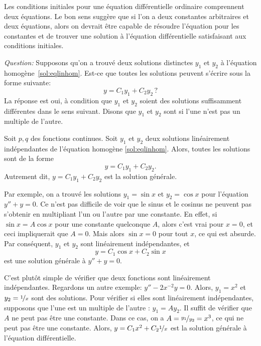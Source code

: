 \medskip

Les conditions initiales pour une équation différentielle ordinaire comprennent deux équations. Le bon sens suggère que si l'on a deux constantes arbitraires et deux équations, alors on devrait être capable de résoudre l'équation pour les constantes et de trouver une solution à l'équation différentielle satisfaisant aux conditions initiales. 

\emph{Question:} Supposons qu'on a trouvé deux solutions distinctes $y_1$ et $y_2$ à l'équation homogène~\eqref{sol:eqlinhom}.  Est-ce que toutes les solutions peuvent s'écrire sous la forme suivante:
\begin{equation*}
	y = C_1 y_1 + C_2 y_2\,?
\end{equation*}
La réponse est oui, à condition que $y_1$ et $y_2$ soient des solutions suffisamment différentes dans le sens suivant.  Disons que $y_1$ et $y_2$ sont \emph{} si l'une n'est pas un multiple de l'autre.

\begin{theorem}
	Soit $p, q$ des fonctions continues.
	Soit $y_1$ et $y_2$ deux solutions linéairement indépendantes de l'équation homogène \eqref{sol:eqlinhom}. 
	Alors, toutes les solutions sont de la forme 
	\begin{equation*}
		y = C_1 y_1 + C_2 y_2 .
	\end{equation*}
	Autrement dit, $y = C_1 y_1 + C_2 y_2$ est la solution générale.
\end{theorem}

Par exemple, on a trouvé les solutions 
$y_1 = \sin x$ et $y_2 = \cos x$ pour l'équation $y'' + y = 0$.  Ce n'est pas difficile de voir que le sinus et le cosinus ne peuvent pas s'obtenir en multipliant l'un ou l'autre par une constante.
En effet, si $\sin x = A \cos x$ pour une constante quelconque $A$,
alors c'est vrai pour $x=0$, et ceci impliquerait que  $A = 0$.  
Mais alors $\sin x = 0$ pour tout $x$, ce qui est absurde.
Par conséquent, $y_1$ et $y_2$ sont linéairement indépendantes, et
\begin{equation*}
	y = C_1 \cos x + C_2 \sin x 
\end{equation*}
est une solution générale à $y'' + y = 0$.


C'est plutôt simple de vérifier que deux fonctions sont linéairement indépendantes. 
Regardons un autre exemple:    $y''-2x^{-2}y = 0$.  
Alors, $y_1 = x^2$ et $y_2 = \nicefrac{1}{x}$ sont des solutions.  
Pour vérifier si elles sont linéairement indépendantes, supposons que l'une est un  multiple de l'autre : 
$y_1 = A y_2$.  Il suffit de vérifier que  $A$ ne peut pas être une constante.  
Dans ce cas, on a $A = \nicefrac{y_1}{y_2} = x^3$, ce qui ne peut pas être une constante. 
Alors, $y = C_1 x^2 + C_2 \nicefrac{1}{x}$ est la solution générale à l'équation différentielle.

